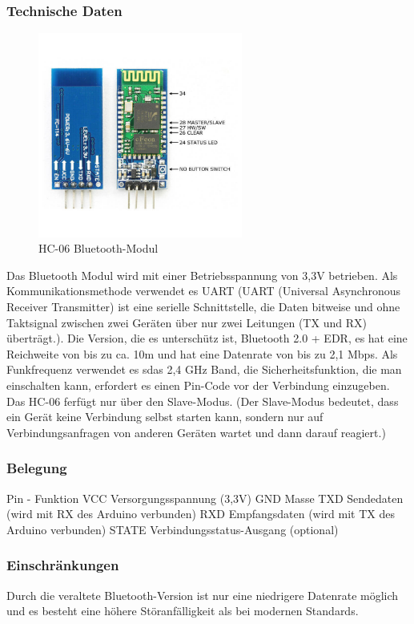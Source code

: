 \subsubsection{Technische Daten}
\begin{figure}[H]
    \centering
    \includegraphics[width=0.6\textwidth]{img/Hardware/hc06.png}
    \caption{HC-06 Bluetooth-Modul}
    \label{fig:hc06}
\end{figure}
Das Bluetooth Modul wird mit einer Betriebsspannung von 3,3V betrieben.
Als Kommunikationsmethode verwendet es UART 
(UART (Universal Asynchronous Receiver Transmitter) ist eine serielle Schnittstelle,
die Daten bitweise und ohne Taktsignal zwischen zwei Geräten über nur zwei Leitungen (TX und RX) überträgt.).
%
Die Version, die es unterschütz ist, Bluetooth 2.0 + EDR, es hat eine Reichweite von bis zu ca. 10m und hat eine Datenrate von bis zu 2,1 Mbps.
%
Als Funkfrequenz verwendet es sdas 2,4 GHz Band, die Sicherheitsfunktion,
die man einschalten kann, erfordert es einen Pin-Code vor der Verbindung einzugeben.
%
Das HC-06 ferfügt nur über den Slave-Modus.
%
(Der Slave-Modus bedeutet, dass ein Gerät keine Verbindung selbst starten kann,
sondern nur auf Verbindungsanfragen von anderen Geräten wartet und dann darauf reagiert.)
\subsubsection{Belegung}
Pin	-	Funktion
VCC	Versorgungsspannung (3,3V)
GND	Masse
TXD	Sendedaten (wird mit RX des Arduino verbunden)
RXD	Empfangsdaten (wird mit TX des Arduino verbunden)
STATE	Verbindungsstatus-Ausgang (optional)

\subsubsection{Einschränkungen}
Durch die veraltete Bluetooth-Version ist nur eine niedrigere Datenrate möglich
und es besteht eine höhere Störanfälligkeit als bei modernen Standards.
%
